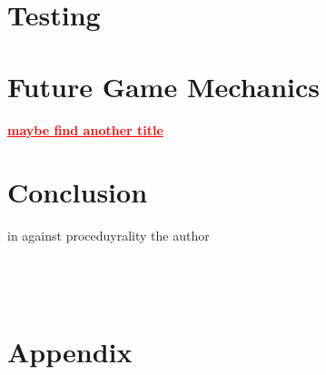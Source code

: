 \documentclass[preprint,12pt, authoryear]{elsarticle}
\newcommand\commenting[1]{\textcolor{red}{\textbf{\underline{#1}}}}
\begin{document}
\section{Testing}


\section{Future Game Mechanics}
\commenting{maybe find another title}
\label{Future}




\section{Conclusion}
in against proceduyrality \citep{sicart2011} the author








\section*{\refname}



\








\appendix

\section{Appendix}
\label{appendix}
\end{document}
